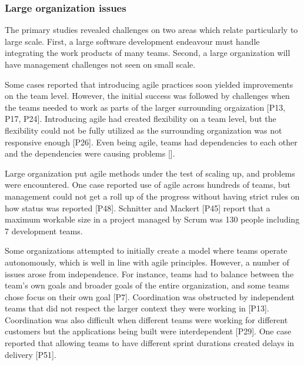 \documentclass[preprint,authoryear,12pt]{elsarticle}
\begin{document}
\subsubsection{Large organization issues}


The primary studies revealed challenges on two areas which relate particularly
to large scale. First, a large software development endeavour must handle
integrating the work products of many teams. Second, a large organization will
have management challenges not seen on small scale.





Some cases reported that introducing agile practices soon yielded improvements
on the team level. However, the initial success was followed by challenges when
the teams needed to work as parts of the larger surrounding orgaization [P13,
P17, P24]. Introducing agile had created flexibility on a team level, but the
flexibility could not be fully utilized as the surrounding organization was not
responsive enough [P26]. Even being agile, teams had dependencies to each other
and the dependencies were causing problems [].

Large organization put agile methods under the test of scaling up, and problems
were encountered. One case reported use of agile across hundreds of teams, but
management could not get a roll up of the progress without having strict rules
on how status was reported [P48]. Schnitter and Mackert [P45] report that a
maximum workable size in a project managed by Scrum was 130 people including 7
development teams.


Some organizations attempted to initially create a model where teams operate
autonomously, which is well in line with agile principles. However, a number of
issues arose from independence. For instance, teams had to balance between the
team's own goals and broader goals of the entire organization, and some teams
chose focus on their own goal [P7]. Coordination was obstructed by independent
teams that did not respect the larger context they were working in [P13].
Coordination was also difficult when different teams were working for different
customers but the applications being built were interdependent [P29]. One case
reported that allowing teams to have different sprint durations created delays
in delivery [P51].
\end{document}
